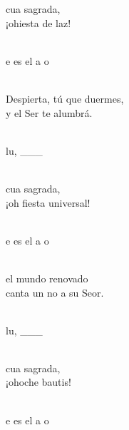 \begin{cancion}%
	cua sagrada,\\
	¡ohiesta de laz!\\\jump\\
	\begin{chorus}%
	e es el a  o \\
	\end{chorus}%
	\jump\\
Despierta, tú que duermes,\\
	y el Ser te alumbrá.\\\jump\\
	\begin{chorus}%
	lu, ___\\
	\end{chorus}%
	\jump\\
	cua sagrada,\\
¡oh fiesta universal!\\\jump\\
	\begin{chorus}%
	e es el a  o \\
	\end{chorus}%
	\jump\\
el mundo renovado\\
	canta un no a su Seor.\\\jump\\
	\begin{chorus}%
	lu, ___\\
	\end{chorus}%
	\jump\\
	cua sagrada,\\
	¡ohoche bautis!\\\jump\\
	\begin{chorus}%
	e es el a  o \\
	\end{chorus}%

\end{cancion}
